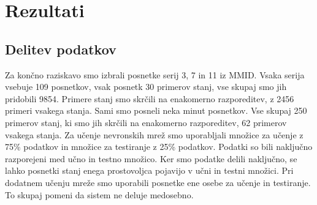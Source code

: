 \chapter{Rezultati}
\section{Delitev podatkov}
Za končno raziskavo smo izbrali posnetke serij 3, 7 in 11 iz MMID. Vsaka serija vsebuje 109 posnetkov, vsak posnetk 30 primerov stanj, vse skupaj smo jih pridobili 9854. Primere stanj smo skrčili na enakomerno razporeditev, z 2456 primeri vsakega stanja. Sami smo posneli neka minut posnetkov. Vse skupaj 250 primerov stanj, ki smo jih skrčili na enakomerno razporeditev, 62 primerov vsakega stanja. Za učenje nevronskih mrež smo uporabljali množice za učenje z 75\% podatkov in množice za testiranje z 25\% podatkov. Podatki so bili naključno razporejeni med učno in testno množico. Ker smo podatke delili naključno, se lahko posnetki stanj enega prostovoljca pojavijo v učni in testni množici. Pri dodatnem učenju mreže smo uporabili posnetke ene osebe za učenje in testiranje. To skupaj pomeni da sistem ne deluje medosebno. 

